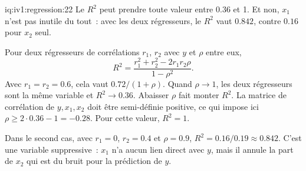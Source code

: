 \begin{solution}{iq:iv1:regression:22}
Le $R^2$ peut prendre toute valeur entre $0.36$ et 1. Et non, $x_1$ n'est pas inutile du tout~: avec les deux régresseurs, le $R^2$ vaut $0.842$, contre $0.16$ pour $x_2$ seul.

Pour deux régresseurs de corrélations $r_1$, $r_2$ avec $y$ et $\rho$ entre eux,
\[
R^2 = \frac{r_1^2 + r_2^2 - 2 r_1 r_2 \rho}{1 - \rho^2} .
\]
Avec $r_1 = r_2 = 0.6$, cela vaut $0.72/(1 + \rho)$. Quand $\rho \to 1$, les deux régresseurs sont la même variable et $R^2 \to 0.36$. Abaisser $\rho$ fait monter $R^2$. La matrice de corrélation de $y, x_1, x_2$ doit être semi-définie positive, ce qui impose ici $\rho \ge 2 \cdot 0.36 - 1 = -0.28$. Pour cette valeur, $R^2 = 1$.

Dans le second cas, avec $r_1 = 0$, $r_2 = 0.4$ et $\rho = 0.9$, $R^2 = 0.16/0.19 \approx 0.842$. C'est une variable suppressive~: $x_1$ n'a aucun lien direct avec $y$, mais il annule la part de $x_2$ qui est du bruit pour la prédiction de $y$.

\end{solution}

